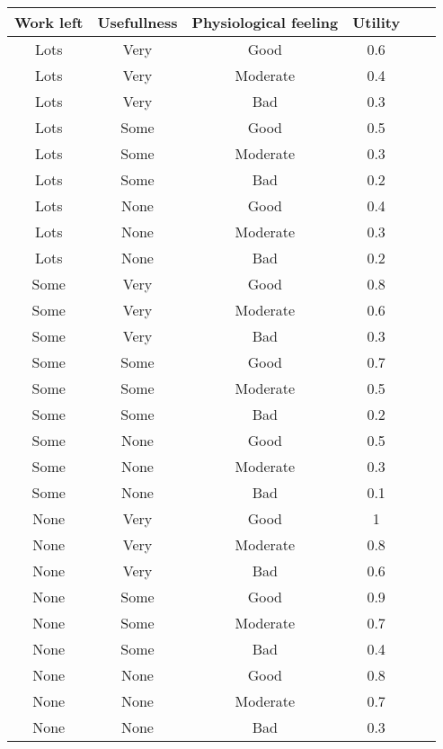 \begin{tabular}{|c|c|c|c|c|c|}
\hline
Work left   &   Usefullness &   Physiological feeling   &   Utility \\
\hline
Lots    &   Very    &   Good    &   0.6 \\
Lots    &   Very    &   Moderate    &   0.4 \\
Lots    &   Very    &   Bad &   0.3 \\
Lots    &   Some    &   Good    &   0.5 \\
Lots    &   Some    &   Moderate    &   0.3 \\
Lots    &   Some    &   Bad &   0.2 \\
Lots    &   None    &   Good    &   0.4 \\
Lots    &   None    &   Moderate    &   0.3 \\
Lots    &   None    &   Bad &   0.2 \\
Some    &   Very    &   Good    &   0.8 \\
Some    &   Very    &   Moderate    &   0.6 \\
Some    &   Very    &   Bad &   0.3 \\
Some    &   Some    &   Good    &   0.7 \\
Some    &   Some    &   Moderate    &   0.5 \\
Some    &   Some    &   Bad &   0.2 \\
Some    &   None    &   Good    &   0.5 \\
Some    &   None    &   Moderate    &   0.3 \\
Some    &   None    &   Bad &   0.1 \\
None    &   Very    &   Good    &   1   \\
None    &   Very    &   Moderate    &   0.8 \\
None    &   Very    &   Bad &   0.6 \\
None    &   Some    &   Good    &   0.9 \\
None    &   Some    &   Moderate    &   0.7 \\
None    &   Some    &   Bad &   0.4 \\
None    &   None    &   Good    &   0.8 \\
None    &   None    &   Moderate    &   0.7 \\
None    &   None    &   Bad &   0.3 \\

\hline
\end{tabular}